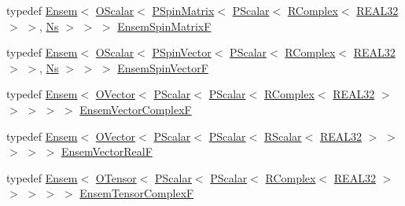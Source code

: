 \begin{DoxyCompactItemize}
\item 
typedef \mbox{\hyperlink{classENSEM_1_1Ensem}{Ensem}}$<$ \mbox{\hyperlink{classENSEM_1_1OScalar}{O\+Scalar}}$<$ \mbox{\hyperlink{classENSEM_1_1PSpinMatrix}{P\+Spin\+Matrix}}$<$ \mbox{\hyperlink{classENSEM_1_1PScalar}{P\+Scalar}}$<$ \mbox{\hyperlink{classENSEM_1_1RComplex}{R\+Complex}}$<$ \mbox{\hyperlink{namespaceENSEM_a7540d01191172323e9073283d772576d}{R\+E\+A\+L32}} $>$ $>$, \mbox{\hyperlink{namespaceENSEM_a6f05e048f9b2eb1a19131074f8abc25f}{Ns}} $>$ $>$ $>$ \mbox{\hyperlink{group__defs_gaa172105da4407f0e7ee578ef2860789d}{Ensem\+Spin\+MatrixF}}
\item 
typedef \mbox{\hyperlink{classENSEM_1_1Ensem}{Ensem}}$<$ \mbox{\hyperlink{classENSEM_1_1OScalar}{O\+Scalar}}$<$ \mbox{\hyperlink{classENSEM_1_1PSpinVector}{P\+Spin\+Vector}}$<$ \mbox{\hyperlink{classENSEM_1_1PScalar}{P\+Scalar}}$<$ \mbox{\hyperlink{classENSEM_1_1RComplex}{R\+Complex}}$<$ \mbox{\hyperlink{namespaceENSEM_a7540d01191172323e9073283d772576d}{R\+E\+A\+L32}} $>$ $>$, \mbox{\hyperlink{namespaceENSEM_a6f05e048f9b2eb1a19131074f8abc25f}{Ns}} $>$ $>$ $>$ \mbox{\hyperlink{group__defs_ga6e77c99e4a59f258b6920dcdc7e8b011}{Ensem\+Spin\+VectorF}}
\item 
typedef \mbox{\hyperlink{classENSEM_1_1Ensem}{Ensem}}$<$ \mbox{\hyperlink{classENSEM_1_1OVector}{O\+Vector}}$<$ \mbox{\hyperlink{classENSEM_1_1PScalar}{P\+Scalar}}$<$ \mbox{\hyperlink{classENSEM_1_1PScalar}{P\+Scalar}}$<$ \mbox{\hyperlink{classENSEM_1_1RComplex}{R\+Complex}}$<$ \mbox{\hyperlink{namespaceENSEM_a7540d01191172323e9073283d772576d}{R\+E\+A\+L32}} $>$ $>$ $>$ $>$ $>$ \mbox{\hyperlink{group__defs_ga1e5f825ea470aefb26cfc8ac86b07aff}{Ensem\+Vector\+ComplexF}}
\item 
typedef \mbox{\hyperlink{classENSEM_1_1Ensem}{Ensem}}$<$ \mbox{\hyperlink{classENSEM_1_1OVector}{O\+Vector}}$<$ \mbox{\hyperlink{classENSEM_1_1PScalar}{P\+Scalar}}$<$ \mbox{\hyperlink{classENSEM_1_1PScalar}{P\+Scalar}}$<$ \mbox{\hyperlink{classENSEM_1_1RScalar}{R\+Scalar}}$<$ \mbox{\hyperlink{namespaceENSEM_a7540d01191172323e9073283d772576d}{R\+E\+A\+L32}} $>$ $>$ $>$ $>$ $>$ \mbox{\hyperlink{group__defs_ga3a76e6a8a956cba16fc997a3e86fd24b}{Ensem\+Vector\+RealF}}
\item 
typedef \mbox{\hyperlink{classENSEM_1_1Ensem}{Ensem}}$<$ \mbox{\hyperlink{classENSEM_1_1OTensor}{O\+Tensor}}$<$ \mbox{\hyperlink{classENSEM_1_1PScalar}{P\+Scalar}}$<$ \mbox{\hyperlink{classENSEM_1_1PScalar}{P\+Scalar}}$<$ \mbox{\hyperlink{classENSEM_1_1RComplex}{R\+Complex}}$<$ \mbox{\hyperlink{namespaceENSEM_a7540d01191172323e9073283d772576d}{R\+E\+A\+L32}} $>$ $>$ $>$ $>$ $>$ \mbox{\hyperlink{group__defs_ga0db22e9868127d6f3c8d522dd70aea59}{Ensem\+Tensor\+ComplexF}}

\end{DoxyCompactItemize}
